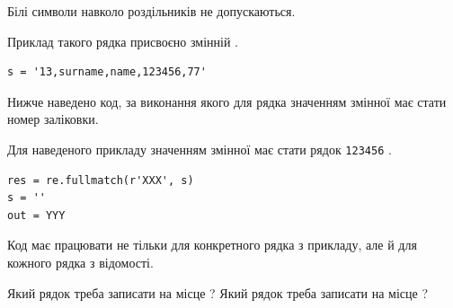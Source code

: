 \documentclass[12pt, ukrainian]{article}
\def\code#1{\Verb!#1!}
\begin{document}
{Білі символи навколо роздільників не допускаються.

Приклад такого рядка присвоєно змінній .



\begin{verbatim}
s = '13,surname,name,123456,77'
\end{verbatim}


Нижче наведено код, за виконання якого для рядка  значенням змінної  має стати номер заліковки.

Для наведеного прикладу значенням змінної  має стати рядок \code{123456} .



\begin{verbatim}
res = re.fullmatch(r'XXX', s)
s = ''
out = YYY
\end{verbatim}


Код має працювати не тільки для конкретного рядка з прикладу, але й для кожного рядка з відомості.


Який рядок треба записати на місце  ?
Який рядок треба записати на місце  ?\par

}
\newpage
\end{document}
